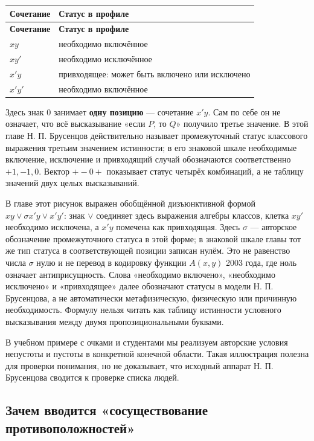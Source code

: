 \documentclass[12pt,a4paper]{article}
\begin{document}
\begin{longtable}{P{0.290\textwidth}P{0.620\textwidth}}
\toprule
\textbf{Сочетание} & \textbf{Статус в профиле} \\
\midrule
\endfirsthead
\toprule
\textbf{Сочетание} & \textbf{Статус в профиле} \\
\midrule
\endhead
\(xy\) & необходимо включённое \\
\(xy'\) & необходимо исключённое \\
\(x'y\) & привходящее: может быть включено или исключено \\
\(x'y'\) & необходимо включённое \\
\bottomrule
\end{longtable}

Здесь знак \(0\) занимает \textbf{одну позицию} — сочетание \(x'y\). Сам по себе он не означает, что всё высказывание «если \(P\), то \(Q\)» получило третье значение. В этой главе Н. П. Брусенцов действительно называет промежуточный статус классового выражения третьим значением истинности; в его знаковой шкале необходимые включение, исключение и привходящий случай обозначаются соответственно \(+1,-1,0\). Вектор \(+-0+\) показывает статус четырёх комбинаций, а не таблицу значений двух целых высказываний.

В главе этот рисунок выражен обобщённой дизъюнктивной формой \(xy\lor\sigma x'y\lor x'y'\): знак \(\lor\) соединяет здесь выражения алгебры классов, клетка \(xy'\) необходимо исключена, а \(x'y\) помечена как привходящая. Здесь \(\sigma\) — авторское обозначение промежуточного статуса в этой форме; в знаковой шкале главы тот же тип статуса в соответствующей позиции записан нулём. Это не равенство числа \(\sigma\) нулю и не перевод в кодировку функции \(A(x,y)\) 2003 года, где ноль означает антиприсущность. Слова «необходимо включено», «необходимо исключено» и «привходящее» далее обозначают статусы в модели Н. П. Брусенцова, а не автоматически метафизическую, физическую или причинную необходимость. Формулу нельзя читать как таблицу истинности условного высказывания между двумя пропозициональными буквами.

В учебном примере с очками и студентами мы реализуем авторские условия непустоты и пустоты в конкретной конечной области. Такая иллюстрация полезна для проверки понимания, но не доказывает, что исходный аппарат Н. П. Брусенцова сводится к проверке списка людей.

\subsection{Зачем вводится «сосуществование противоположностей»}
\end{document}
